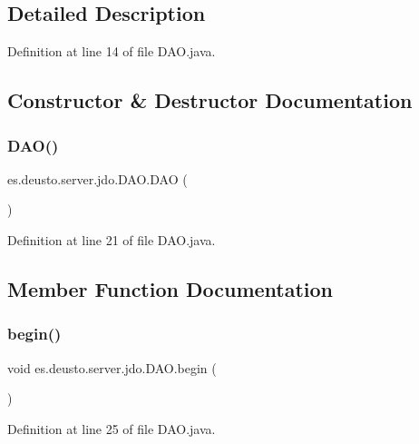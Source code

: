 \subsection{Detailed Description}


Definition at line 14 of file D\+A\+O.\+java.



\subsection{Constructor \& Destructor Documentation}
\mbox{\label{classes_1_1deusto_1_1server_1_1jdo_1_1_d_a_o_a6b7d3b6555e4f370d347919a33620607}} 
\subsubsection{\texorpdfstring{DAO()}{DAO()}}
{\footnotesize\ttfamily es.\+deusto.\+server.\+jdo.\+D\+A\+O.\+D\+AO (\begin{DoxyParamCaption}{ }\end{DoxyParamCaption})}



Definition at line 21 of file D\+A\+O.\+java.



\subsection{Member Function Documentation}
\mbox{\label{classes_1_1deusto_1_1server_1_1jdo_1_1_d_a_o_ad923bb21c8273dabc601b85713703c89}} 
\subsubsection{\texorpdfstring{begin()}{begin()}}
{\footnotesize\ttfamily void es.\+deusto.\+server.\+jdo.\+D\+A\+O.\+begin (\begin{DoxyParamCaption}{ }\end{DoxyParamCaption})}



Definition at line 25 of file D\+A\+O.\+java.

